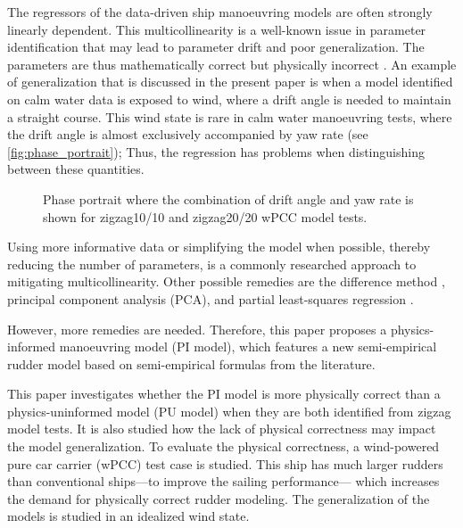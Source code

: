 %
The regressors of the data-driven ship manoeuvring models are often strongly linearly dependent. This multicollinearity is a well-known issue in parameter identification that may lead to parameter drift and poor generalization. The parameters are thus mathematically correct but physically incorrect \citep{luo_parameter_2016-1}. 
An example of generalization that is discussed in the present paper is when a model identified on calm water data is exposed to wind, where a drift angle is needed to maintain a straight course. This wind state is rare in calm water manoeuvring tests, where the drift angle is almost exclusively accompanied by yaw rate (see \autoref{fig:phase_portrait}); 
Thus, the regression has problems when distinguishing between these quantities.
%
\begin{figure}[h]
  \centering
  
  \caption{Phase portrait where the combination of drift angle and yaw rate is shown for zigzag10/10 and zigzag20/20 wPCC model tests.}
  \label{fig:phase_portrait}
\end{figure}
Using more informative data or simplifying the model when possible, thereby reducing the number of parameters, is a commonly researched approach to mitigating multicollinearity. Other possible remedies are the difference method \citep{luo_parameter_2016-1}, principal component analysis (PCA), and partial least-squares regression \citep{jian-chuan_parametric_2015}. 

However, more remedies are needed. Therefore, this paper proposes a physics-informed manoeuvring model (PI model), which features a new semi-empirical rudder model based on semi-empirical formulas from the literature.

This paper investigates whether the PI model is more physically correct than a physics-uninformed model (PU model) when they are both identified from zigzag model tests. It is also studied how the lack of physical correctness may impact the model generalization.
To evaluate the physical correctness, a wind-powered pure car carrier (wPCC) test case is studied. 
This ship has much larger rudders than conventional ships---to improve the sailing performance---
which increases the demand for physically correct rudder modeling. The generalization of the models is studied in an idealized wind state.


